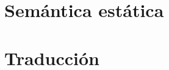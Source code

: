 \documentclass[11pt]{article}
\newcounter{subsubsubsection}[subsubsection]
\begin{document}
\section{Semántica estática}
 {
  \let\section\subsection
  \let\subsection\subsubsection
  \let\subsubsection\subsubsubsection
 }

\section{Traducción}
 {
  \let\section\subsection
  \let\subsection\subsubsection
  \let\subsubsection\subsubsubsection
 }
\end{document}

